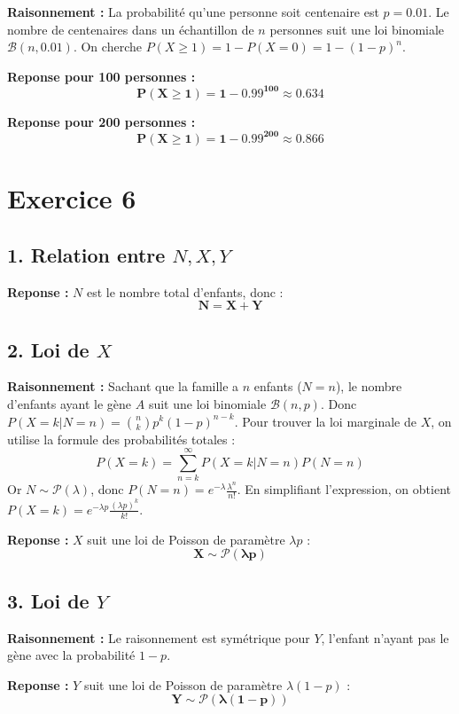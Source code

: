 \documentclass[11pt,a4paper]{article}
\begin{document}
\textbf{Raisonnement :} La probabilité qu'une personne soit centenaire est $p = 0.01$. Le nombre de centenaires dans un échantillon de $n$ personnes suit une loi binomiale $\mathcal{B}(n, 0.01)$.
On cherche $P(X \ge 1) = 1 - P(X=0) = 1 - (1-p)^n$.

\textbf{Reponse pour 100 personnes :}
$$
\mathbf{P(X \ge 1) = 1 - 0.99^{100} \approx 0.634}
$$

\textbf{Reponse pour 200 personnes :}
$$
\mathbf{P(X \ge 1) = 1 - 0.99^{200} \approx 0.866}
$$

\hrulefill

\section*{Exercice 6}

\subsection*{1. Relation entre $N, X, Y$}

\textbf{Reponse :} $N$ est le nombre total d'enfants, donc :
$$
\mathbf{N = X + Y}
$$

\subsection*{2. Loi de $X$}

\textbf{Raisonnement :} Sachant que la famille a $n$ enfants ($N=n$), le nombre d'enfants ayant le gène $A$ suit une loi binomiale $\mathcal{B}(n, p)$. Donc $P(X=k | N=n) = \binom{n}{k}p^k(1-p)^{n-k}$.
Pour trouver la loi marginale de $X$, on utilise la formule des probabilités totales :
$$ P(X=k) = \sum_{n=k}^{\infty} P(X=k | N=n)P(N=n) $$
Or $N \sim \mathcal{P}(\lambda)$, donc $P(N=n) = e^{-\lambda}\frac{\lambda^n}{n!}$.
En simplifiant l'expression, on obtient $P(X=k) = e^{-\lambda p} \frac{(\lambda p)^k}{k!}$.

\textbf{Reponse :} $X$ suit une loi de Poisson de paramètre $\lambda p$ :
$$
\mathbf{X \sim \mathcal{P}(\lambda p)}
$$

\subsection*{3. Loi de $Y$}

\textbf{Raisonnement :} Le raisonnement est symétrique pour $Y$, l'enfant n'ayant pas le gène avec la probabilité $1-p$.

\textbf{Reponse :} $Y$ suit une loi de Poisson de paramètre $\lambda(1-p)$ :
$$
\mathbf{Y \sim \mathcal{P}(\lambda(1-p))}
$$
\end{document}
